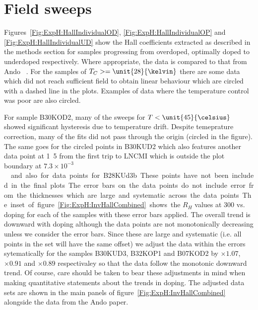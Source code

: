 \section{Field sweeps}

Figures~\ref{Fig:ExpH:HallIndividualOD}, \ref{Fig:ExpH:HallIndividualOP} and \ref{Fig:ExpH:HallIndividualUD} show the Hall coefficients extracted as described in the methods section for samples progressing from overdoped, optimally doped to underdoped respectively. Where appropriate, the data is compared to that from Ando \etal~\cite{Ando1999}. For the samples of $T_C >= \unit{28}{\kelvin}$ there are some data which did not reach sufficient field to obtain linear behaviour which are circled with a dashed line in the plots. Examples of data where the temperature control was poor are also circled.

For sample B30KOD2, many of the sweeps for $T < \unit{45}{\celsius}$ showed significant hysteresis due to temperature drift. Despite temeprature correction, many of the fits did not pass through the origin (circled in the figure). The same goes for the circled points in B30KUD2 which also features another data point at \unit{1.5}{\kelvin} from the first trip to \ac{LNCMI} which is outside the plot boundary at \unit{$7.3\times10^{-3}$}{\centi\metre\cubed} and also for data points for B28KUd3b. These points have not been included in the final plots.

The error bars on the data points do not include error from the thicknesses which are large and systematic across the data points. The inset of figure~\ref{Fig:ExpH:InvHallCombined} shows the $R_H$ values at \unit{300}{\kelvin} vs. doping for each of the samples with these error bars applied. The overall trend is downward with doping although the data points are not monotonically decreasing unless we consider the error bars. Since these are large and systematic (i.e. all points in the set will have the same offset) we adjust the data within the errors sytematically for the samples B30KUD3, B32KOP1 and B07KOD2 by $\times1.07$, $\times0.91$ and $\times0.89$ respectivaley so that the data follow the monotonic downward trend. Of course, care should be taken to bear these adjustments in mind when making quantitative statements about the trends in doping. The adjusted data sets are shown in the main panels of figure~\ref{Fig:ExpH:InvHallCombined} alongside the data from the Ando paper.

